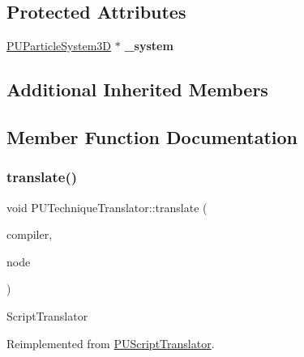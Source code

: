 \subsection*{Protected Attributes}
\begin{DoxyCompactItemize}
\item 
\mbox{\label{classPUTechniqueTranslator_a9bfa8a321a87d2bd17dbd07747802922}} 
\hyperlink{classPUParticleSystem3D}{P\+U\+Particle\+System3D} $\ast$ {\bfseries \+\_\+system}
\end{DoxyCompactItemize}
\subsection*{Additional Inherited Members}


\subsection{Member Function Documentation}
\mbox{\label{classPUTechniqueTranslator_ac756b8f5359ef77b6cb8f7f6b17e4104}} 
\subsubsection{\texorpdfstring{translate()}{translate()}\hspace{0.1cm}{\footnotesize\ttfamily [1/2]}}
{\footnotesize\ttfamily void P\+U\+Technique\+Translator\+::translate (\begin{DoxyParamCaption}\item[{\hyperlink{classPUScriptCompiler}{P\+U\+Script\+Compiler} $\ast$}]{compiler,  }\item[{\hyperlink{classPUAbstractNode}{P\+U\+Abstract\+Node} $\ast$}]{node }\end{DoxyParamCaption})\hspace{0.3cm}{\ttfamily [virtual]}}

Script\+Translator 

Reimplemented from \hyperlink{classPUScriptTranslator_a9ff2cdfda9ea8db6fd716e7b69dbe79b}{P\+U\+Script\+Translator}.

\mbox{\label{classPUTechniqueTranslator_ae8b399fbf75bebaa1b1b76e57a186f3d}} 
